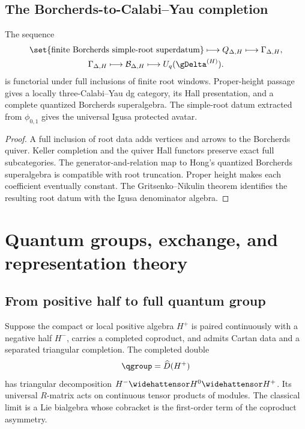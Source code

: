 \chapter{The Borcherds-to-Calabi--Yau completion}
\begin{theorem}
The sequence
\[
\begin{gathered}
 \set{\text{finite Borcherds simple-root superdatum}}
 \longmapsto Q_{\Delta,H}
 \longmapsto \Gamma_{\Delta,H},\\
 \Gamma_{\Delta,H}
 \longmapsto \mathcal B_{\Delta,H}
 \longmapsto U_q(\gDelta^{(H)}).
\end{gathered}
\]
is functorial under full inclusions of finite root windows.  Proper-height passage gives a locally three-Calabi--Yau dg category, its Hall presentation, and a complete quantized Borcherds superalgebra.  The simple-root datum extracted from $\phi_{0,1}$ gives the universal Igusa protected avatar.
\end{theorem}
\begin{proof}
A full inclusion of root data adds vertices and arrows to the Borcherds quiver.  Keller completion and the quiver Hall functors preserve exact full subcategories.  The generator-and-relation map to Hong's quantized Borcherds superalgebra is compatible with root truncation.  Proper height makes each coefficient eventually constant.  The Gritsenko--Nikulin theorem identifies the resulting root datum with the Igusa denominator algebra.
\end{proof}


\part{Quantum groups, exchange, and representation theory}

\chapter{From positive half to full quantum group}
Suppose the compact or local positive algebra $H^+$ is paired continuously with a negative half $H^-$, carries a completed coproduct, and admits Cartan data and a separated triangular completion. The completed double
\[
 \qgroup=\widehat D(H^+)
\]
has triangular decomposition $H^-\widehattensor H^0\widehattensor H^+$. Its universal $R$-matrix acts on continuous tensor products of modules. The classical limit is a Lie bialgebra whose cobracket is the first-order term of the coproduct asymmetry.


